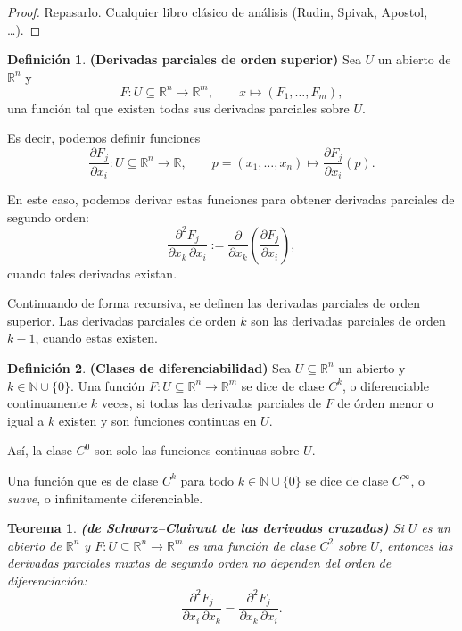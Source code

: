 \documentclass[11pt]{article}
\newtheorem*{theorem}{Teorema}
\theoremstyle{definition}
\newtheorem*{definition}{Definici\'on}
\theoremstyle{remark}
\begin{document}
\begin{proof}
Repasarlo. Cualquier libro cl\'asico de an\'alisis (Rudin, Spivak, Apostol, \dots).
\end{proof}

\begin{definition}
\textbf{(Derivadas parciales de orden superior)}\;
Sea $U$ un abierto de $\mathbb{R}^n$ y
\[
F:U\subseteq \mathbb{R}^n \longrightarrow \mathbb{R}^m,\qquad
x\longmapsto (F_1,\dots,F_m),
\]
una funci\'on tal que existen todas sus derivadas parciales sobre $U$.

Es decir, podemos definir funciones
\[
\frac{\partial F_j}{\partial x_i}:U\subseteq \mathbb{R}^n \longrightarrow \mathbb{R},
\qquad
p=(x_1,\dots,x_n)\longmapsto \frac{\partial F_j}{\partial x_i}(p).
\]

En este caso, podemos derivar estas funciones para obtener derivadas parciales de segundo orden:
\[
\frac{\partial^2 F_j}{\partial x_k\,\partial x_i}
:=
\frac{\partial}{\partial x_k}\left(\frac{\partial F_j}{\partial x_i}\right),
\]
cuando tales derivadas existan.

Continuando de forma recursiva, se definen las derivadas parciales de orden superior. Las derivadas parciales de orden $k$ son las derivadas parciales de orden $k-1$, cuando estas existen.
\end{definition}

\begin{definition}
\textbf{(Clases de diferenciabilidad)}\;
Sea $U\subseteq \mathbb{R}^n$ un abierto y $k\in \mathbb{N}\cup\{0\}$. Una funci\'on $F:U\subseteq \mathbb{R}^n\to \mathbb{R}^m$ se dice de clase $C^k$, o diferenciable continuamente $k$ veces, si todas las derivadas parciales de $F$ de \'orden menor o igual a $k$ existen y son funciones continuas en $U$.

As\'i, la clase $C^0$ son solo las funciones continuas sobre $U$.

Una funci\'on que es de clase $C^k$ para todo $k\in \mathbb{N}\cup\{0\}$ se dice de clase $C^\infty$, o \emph{suave}, o infinitamente diferenciable.
\end{definition}

\begin{theorem}
\textbf{(de Schwarz--Clairaut de las derivadas cruzadas)}\;
Si $U$ es un abierto de $\mathbb{R}^n$ y $F:U\subseteq \mathbb{R}^n\to \mathbb{R}^m$ es una funci\'on de clase $C^2$ sobre $U$, entonces las derivadas parciales mixtas de segundo orden no dependen del orden de diferenciaci\'on:
\[
\frac{\partial^2 F_j}{\partial x_i\,\partial x_k}
=
\frac{\partial^2 F_j}{\partial x_k\,\partial x_i}.
\]
\end{theorem}
\end{document}
